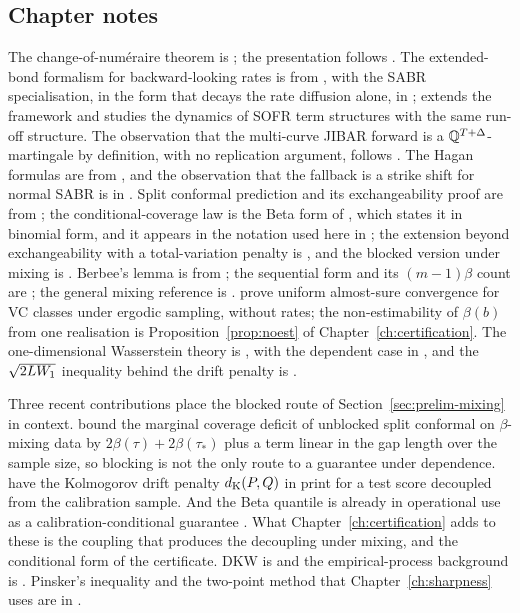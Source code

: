 \documentclass[../../../main.tex]{subfiles}
\begin{document}
\subsection*{Chapter notes}

The change-of-num\'eraire theorem is \cite{geman1995}; the presentation follows \cite{brigo2006}. The extended-bond formalism for backward-looking rates is from \cite{lyashenko2019}, with the SABR specialisation, in the form that decays the rate diffusion alone, in \cite[eqs.~(3)--(4), p.~4]{willems2020}; \cite{lyashenko2020} extends the framework and \cite{brace2024} studies the dynamics of SOFR term structures with the same run-off structure. The observation that the multi-curve JIBAR forward is a $\mathbb{Q}^{T+\Delta}$-martingale by definition, with no replication argument, follows \cite{henrard2014}. The Hagan formulas are from \cite{hagan2002}, and the observation that the fallback is a strike shift for normal SABR is in \cite{piterbarg2020}. Split conformal prediction and its exchangeability proof are from \cite{vovk2005}; the conditional-coverage law is the Beta form of \cite[Prop.~2b, p.~479]{vovk2012}, which states it in binomial form, and it appears in the notation used here in \cite[eq.~(4)]{zwart2025}; the extension beyond exchangeability with a total-variation penalty is \cite{barber2023}, and the blocked version under mixing is \cite{oliveira2024}. Berbee's lemma is from \cite{berbee1979}; the sequential form and its $(m-1)\beta$ count are \cite[Cor.~2.7 and Lemma~4.1]{yu1994}; the general mixing reference is \cite{doukhan1994}. \cite{adams2010} prove uniform almost-sure convergence for VC classes under ergodic sampling, without rates; the non-estimability of $\beta(b)$ from one realisation is Proposition~\ref{prop:noest} of Chapter~\ref{ch:certification}. The one-dimensional Wasserstein theory is \cite{bobkov2019}, with the dependent case in \cite[Prop.~3.2]{dedecker2017}, and the $\sqrt{2LW_1}$ inequality behind the drift penalty is \cite[Prop.~1, p.~4]{xu2025}.

Three recent contributions place the blocked route of Section~\ref{sec:prelim-mixing} in context. \cite[Cor.~1--2]{barber2026} bound the marginal coverage deficit of unblocked split conformal on $\beta$-mixing data by $2\beta(\tau)+2\beta(\tau_*)$ plus a term linear in the gap length over the sample size, so blocking is not the only route to a guarantee under dependence. \cite[Prop.~13, p.~11]{ramos2026} have the Kolmogorov drift penalty $d_{\mathrm{K}}(P,Q)$ in print for a test score decoupled from the calibration sample. And the Beta quantile is already in operational use as a calibration-conditional guarantee \citep[Sec.~2.2]{zwart2025}. What Chapter~\ref{ch:certification} adds to these is the coupling that produces the decoupling under mixing, and the conditional form of the certificate. DKW is \cite{dkw1956} and the empirical-process background is \cite{vdv1996}. Pinsker's inequality and the two-point method that Chapter~\ref{ch:sharpness} uses are in \cite{tsybakov2009}.
\end{document}

